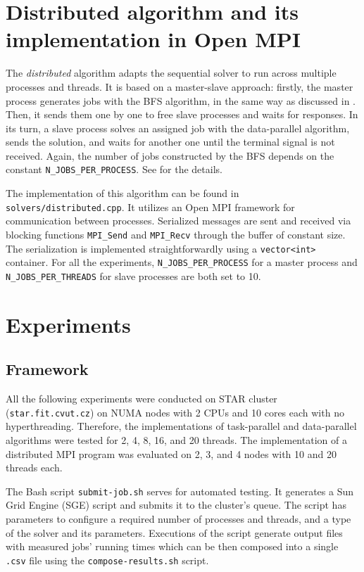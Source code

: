 \documentclass[epsf,epic,eepic,eepicemu]{article}
\newcommand{\var}{\texttt}
\begin{document}
\section{Distributed algorithm and its implementation in Open MPI}

The \textit{distributed} algorithm adapts the sequential solver to run across multiple processes and threads. It is based on a master-slave approach: firstly, the master process generates jobs with the BFS algorithm, in the same way as discussed in . Then, it sends them one by one to free slave processes and waits for responses. In its turn, a slave process solves an assigned job with the data-parallel algorithm, sends the solution, and waits for another one until the terminal signal is not received. Again, the number of jobs constructed by the BFS depends on the constant \var{N\_JOBS\_PER\_PROCESS}. See  for the details.

The implementation of this algorithm can be found in \texttt{solvers/distributed.cpp}. It utilizes an Open MPI framework for communication between processes. Serialized messages are sent and received via blocking functions \texttt{MPI\_Send} and \texttt{MPI\_Recv} through the buffer of constant size. The serialization is implemented straightforwardly using a \texttt{vector<int>} container. For all the experiments, \var{N\_JOBS\_PER\_PROCESS} for a master process and \var{N\_JOBS\_PER\_THREADS} for slave processes are both set to 10.


\section{Experiments}

\subsection*{Framework}
All the following experiments were conducted on STAR cluster (\texttt{star.fit.cvut.cz}) on NUMA nodes with 2 CPUs and 10 cores each with no hyperthreading. Therefore, the implementations of task-parallel and data-parallel algorithms were tested for 2, 4, 8, 16, and 20 threads. The implementation of a distributed MPI program was evaluated on 2, 3, and 4 nodes with 10 and 20 threads each. 

The Bash script \texttt{submit-job.sh} serves for automated testing. It generates a Sun Grid Engine (SGE) script and submits it to the cluster's queue. The script has parameters to configure a required number of processes and threads, and a type of the solver and its parameters. Executions of the script generate output files with measured jobs' running times which can be then composed into a single \texttt{.csv} file using the \texttt{compose-results.sh} script.
\end{document}

